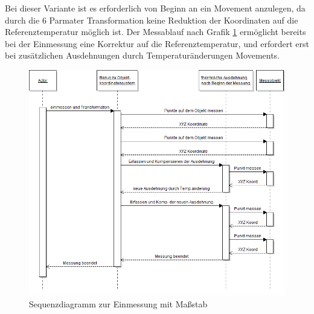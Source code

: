 Bei dieser Variante ist es erforderlich von Beginn an ein Movement anzulegen, da durch die 6 Parmater Transformation keine Reduktion der Koordinaten auf die Referenztemperatur möglich ist. Der Messablauf nach Grafik \ref{fig:massstabSequenz} ermöglicht bereits bei der Einmessung eine Korrektur auf die Referenztemperatur, und erfordert erst bei zusätzlichen Ausdehnungen durch Temperaturänderungen Movements.

\begin{figure}[H]
	\label{fig:massstabSequenz}
	\centering
		\includegraphics[scale=0.5]{UMLDiagramme/einmessenMitMassstabSequenzUML}
	\caption{Sequenzdiagramm zur Einmessung mit Maßstab}
\end{figure}

